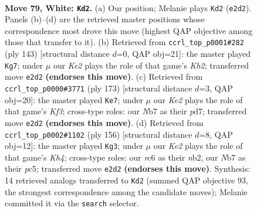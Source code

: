 \documentclass[11pt]{article}
\begin{document}
\clearpage

\begin{figure}[p]\centering
\begin{subfigure}{0.46\textwidth}\centering
\resizebox{\linewidth}{!}{%
\newchessgame
\chessboard[
  setfen={6k1/1NP5/2r5/8/8/6B1/4K3/8 w - - 71 79},
  showmover=false,
  pgfstyle=straightmove, color=movearrow, markmove={e2-d2}
]}
\caption{}
\end{subfigure}\hfill
\begin{subfigure}{0.46\textwidth}\centering
\resizebox{\linewidth}{!}{%
\newchessgame
\chessboard[
  setfen={8/7k/3n4/3b4/1R6/1p6/5K2/8 b - - 17 72},
  showmover=false,
  pgfstyle=straightmove, color=movearrow, markmove={h7-g7}
]}
\caption{}
\end{subfigure}
\\[4pt]
\begin{subfigure}{0.46\textwidth}\centering
\resizebox{\linewidth}{!}{%
\newchessgame
\chessboard[
  setfen={8/3P4/5k2/8/2b5/6K1/p7/R7 b - - 0 87},
  showmover=false,
  pgfstyle=straightmove, color=movearrow, markmove={f6-e7}
]}
\caption{}
\end{subfigure}\hfill
\begin{subfigure}{0.46\textwidth}\centering
\resizebox{\linewidth}{!}{%
\newchessgame
\chessboard[
  setfen={8/4k3/B7/2p5/2P4K/8/1n6/8 w - - 9 79},
  showmover=false,
  pgfstyle=straightmove, color=movearrow, markmove={h4-g3}
]}
\caption{}
\end{subfigure}
\caption{\textbf{Move 79, White: \texttt{Kd2}.} (a) Our position; Melanie plays \texttt{Kd2} (\texttt{e2d2}). Panels (b)--(d) are the retrieved master positions whose correspondence most drove this move (highest QAP objective among those that transfer to it). (b) Retrieved from \texttt{ccrl\_top\_p0001\#282} (ply 143) [structural distance $d$=0, QAP obj=21]: the master played \texttt{Kg7}; under $\mu$ our \emph{Ke2} plays the role of that game's \emph{Kh2}; transferred move \texttt{e2d2} \textbf{(endorses this move)}. (c) Retrieved from \texttt{ccrl\_top\_p0000\#3771} (ply 173) [structural distance $d$=3, QAP obj=20]: the master played \texttt{Ke7}; under $\mu$ our \emph{Ke2} plays the role of that game's \emph{Kf3}; cross-type roles: our \emph{N}b7 as their \emph{p}d7; transferred move \texttt{e2d2} \textbf{(endorses this move)}. (d) Retrieved from \texttt{ccrl\_top\_p0002\#1102} (ply 156) [structural distance $d$=8, QAP obj=12]: the master played \texttt{Kg3}; under $\mu$ our \emph{Ke2} plays the role of that game's \emph{Kh4}; cross-type roles: our \emph{r}c6 as their \emph{n}b2, our \emph{N}b7 as their \emph{p}c5; transferred move \texttt{e2d2} \textbf{(endorses this move)}. Synthesis: 14 retrieved analogs transferred to \texttt{Kd2} (summed QAP objective 93, the strongest correspondence among the candidate moves); Melanie committed it via the \texttt{search} selector.}
\label{fig:thought-m156}
\end{figure}
\end{document}
